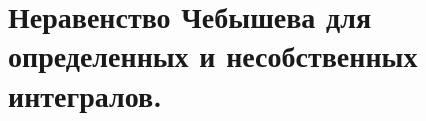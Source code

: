 \documentclass[../main.tex]{subfiles}
\begin{document}
\newpage
\section{Неравенство Чебышева для определенных и несобственных интегралов.}
\end{document}
